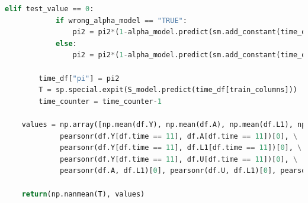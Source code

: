 \begin{lstlisting}[language=Python]
        elif test_value == 0: 
            if wrong_alpha_model == "TRUE":
                pi2 = pi2*(1-alpha_model.predict(sm.add_constant(time_df[["L1_3", "A_3"]], has_constant = "add")))
            else:
                pi2 = pi2*(1-alpha_model.predict(sm.add_constant(time_df[["L1", "L1_1", "A_1", "A_2"]], has_constant = "add")))

        time_df["pi"] = pi2
        T = sp.special.expit(S_model.predict(time_df[train_columns]))
        time_counter = time_counter-1
    
    values = np.array([np.mean(df.Y), np.mean(df.A), np.mean(df.L1), np.mean(df.U), \
             pearsonr(df.Y[df.time == 11], df.A[df.time == 11])[0], \
             pearsonr(df.Y[df.time == 11], df.L1[df.time == 11])[0], \
             pearsonr(df.Y[df.time == 11], df.U[df.time == 11])[0], \
             pearsonr(df.A, df.L1)[0], pearsonr(df.U, df.L1)[0], pearsonr(df.A, df.U)[0]])
    
    return(np.nanmean(T), values)  
\end{lstlisting}

